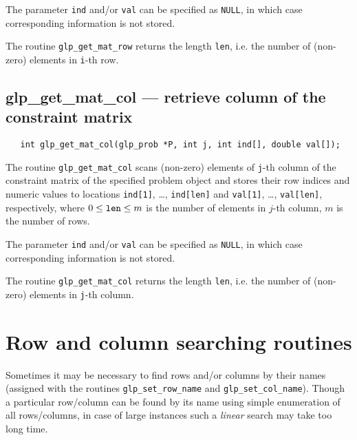 The parameter \verb|ind| and/or \verb|val| can be specified as
\verb|NULL|, in which case corresponding information is not stored.


\returns

The routine \verb|glp_get_mat_row| returns the length \verb|len|, i.e.
the number of (non-zero) elements in \verb|i|-th row.

\subsection{glp\_get\_mat\_col --- retrieve column of the constraint
matrix}

\synopsis

\begin{verbatim}
   int glp_get_mat_col(glp_prob *P, int j, int ind[], double val[]);
\end{verbatim}

\description

The routine \verb|glp_get_mat_col| scans (non-zero) elements of
\verb|j|-th column of the constraint matrix of the specified problem
object and stores their row indices and numeric values to locations
\linebreak \verb|ind[1]|, \dots, \verb|ind[len]| and \verb|val[1]|,
\dots, \verb|val[len]|, respectively, where $0\leq{\tt len}\leq m$ is
the number of elements in $j$-th column, $m$ is the number of rows.

The parameter \verb|ind| and/or \verb|val| can be specified as
\verb|NULL|, in which case corresponding information is not stored.

\returns

The routine \verb|glp_get_mat_col| returns the length \verb|len|, i.e.
the number of (non-zero) elements in \verb|j|-th column.


\newpage

\section{Row and column searching routines}

Sometimes it may be necessary to find rows and/or columns by their
names (assigned with the routines \verb|glp_set_row_name| and
\verb|glp_set_col_name|). Though a particular row/column can be found
by its name using simple enumeration of all rows/columns, in case of
large instances such a {\it linear} search may take too long time.

